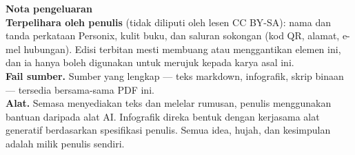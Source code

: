 \clearpage
\thispagestyle{empty}
\begin{flushleft}\small\sffamily
\textbf{Nota pengeluaran}\\[1.2em]

\textbf{Terpelihara oleh penulis} (tidak diliputi oleh lesen CC BY-SA): nama
dan tanda perkataan Personix, kulit buku, dan saluran sokongan (kod QR,
alamat, e-mel hubungan). Edisi terbitan mesti membuang atau menggantikan
elemen ini, dan ia hanya boleh digunakan untuk merujuk kepada karya asal ini.\\[1.2em]

\textbf{Fail sumber.} Sumber yang lengkap --- teks markdown, infografik,
skrip binaan --- tersedia bersama-sama PDF ini.\\[1.2em]

\textbf{Alat.} Semasa menyediakan teks dan melelar rumusan, penulis
menggunakan bantuan daripada alat AI. Infografik direka bentuk dengan
kerjasama alat generatif berdasarkan spesifikasi penulis.
Semua idea, hujah, dan kesimpulan adalah milik penulis sendiri.
\end{flushleft}
\clearpage
